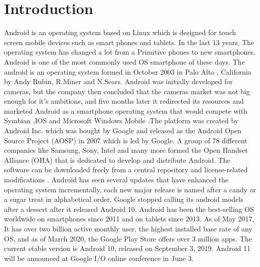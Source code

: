\documentclass[preprint,12pt]{elsarticle}
\begin{document}

\section{\large{Introduction}}
\label{S:1}
Android is an operating system based on Linux which is designed for touch screen mobile devices such as smart phones and tablets. In the last 13 years, The operating system has changed a lot from a Primitive phones to new smartphones. Android is one of the most commonly used OS smartphone of these days. The android is an operating system formed in October 2003 in Palo Alto , California by Andy Rubin, R.Miner and N.Sears. Android was initially developed for cameras, but the company then concluded that the cameras market was not big enough for it's ambitions, and five months later it redirected its resources and marketed Android as a smartphone operating system that would compete with Symbian ,IOS and Microsoft Windows Mobile \cite{1} .The platform was created by Android Inc. which was bought by Google and
released as the Android Open Source Project (AOSP) in 2007 which is led by Google. A group of 78
different companies like Samsung, Sony, Intel and many more formed the Open Handset Alliance (OHA) that is dedicated
to develop and distribute Android. The software can be downloaded freely from a central repository and license-related modifications\cite{2} . Android has seen several updates that have enhanced the operating system incrementally, each new major release is named after a candy or a sugar treat in alphabetical order. Google stopped calling its android models after a dessert after it released Android 10\cite{3}. Android has been the best-selling OS worldwide on smartphones since 2011 and on tablets since 2013. As of May 2017, It has over two billion active monthly user, the highest installed base rate of any OS, and as of March 2020, the Google Play Store offers over 3 million apps. The current stable version is Android 10, released on September 3, 2019. Android 11 will be announced at Google I/O  online conference in June 3.




\end{document}
